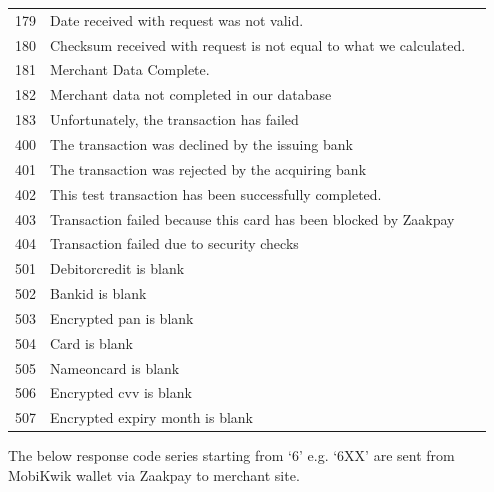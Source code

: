 \documentclass{article}
\newcommand{\xmark}{\ding{55}}
\begin{document}
\begin{longtable}{||c|p{12.5cm}||c|}
179 &Date received with request was not valid.& \textcolor{red} {\xmark} \\
180 &Checksum received with request is not equal to what we calculated.& \textcolor{red} {\xmark} \\
181 & Merchant Data Complete.& \textcolor{red} {\xmark} \\
182 &Merchant data not completed in our database& \textcolor{red} {\xmark} \\
183 &Unfortunately, the transaction has failed& \textcolor{red} {\xmark} \\
400 &The transaction was declined by the issuing bank& \textcolor{red} {\xmark} \\
401 &The transaction was rejected by the acquiring bank& \textcolor{red} {\xmark} \\
402 &This test transaction has been successfully completed.& \textcolor{red} {\xmark} \\
403 &Transaction failed because this card has been blocked by Zaakpay& \textcolor{red} {\xmark} \\
404 &Transaction failed due to security checks& \textcolor{red} {\xmark} \\
501 &Debitorcredit is blank& \textcolor{red} {\xmark} \\
502 &Bankid is blank& \textcolor{red} {\xmark} \\
503 &Encrypted pan is blank& \textcolor{red} {\xmark} \\
504 &Card is blank& \textcolor{red} {\xmark} \\
505 &Nameoncard is blank& \textcolor{red} {\xmark} \\
506 &Encrypted cvv is blank& \textcolor{red} {\xmark} \\
507 &Encrypted expiry month is blank& \textcolor{red} {\xmark} \\\end{longtable}
\newpage
The below response code series starting from ‘6’ e.g. ‘6XX’ are sent from MobiKwik wallet via Zaakpay to merchant site. \\
\end{document}
